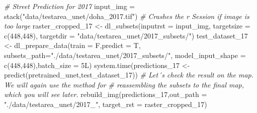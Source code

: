 \documentclass[
]{article}
\newenvironment{Shaded}{\begin{snugshade}}{\end{snugshade}}
\newcommand{\AttributeTok}[1]{\textcolor[rgb]{0.77,0.63,0.00}{#1}}
\newcommand{\CommentTok}[1]{\textcolor[rgb]{0.56,0.35,0.01}{\textit{#1}}}
\newcommand{\DecValTok}[1]{\textcolor[rgb]{0.00,0.00,0.81}{#1}}
\newcommand{\FunctionTok}[1]{\textcolor[rgb]{0.00,0.00,0.00}{#1}}
\newcommand{\NormalTok}[1]{#1}
\newcommand{\OtherTok}[1]{\textcolor[rgb]{0.56,0.35,0.01}{#1}}
\newcommand{\StringTok}[1]{\textcolor[rgb]{0.31,0.60,0.02}{#1}}
\begin{document}
\begin{Shaded}
\begin{Highlighting}[]
\CommentTok{\# Street Prediction for 2017}
\NormalTok{input\_img }\OtherTok{=} \FunctionTok{stack}\NormalTok{(}\StringTok{"data/testarea\_unet/doha\_2017.tif"}\NormalTok{)}
\CommentTok{\# Crashes the r Session if image is too large}
\NormalTok{raster\_cropped\_17 }\OtherTok{\textless{}{-}} \FunctionTok{dl\_subsets}\NormalTok{(}\AttributeTok{inputrst =}\NormalTok{ input\_img, }\AttributeTok{targetsize =} \FunctionTok{c}\NormalTok{(}\DecValTok{448}\NormalTok{,}\DecValTok{448}\NormalTok{), }
                                \AttributeTok{targetdir =} \StringTok{"data/testarea\_unet/2017\_subsets/"}\NormalTok{)}
\NormalTok{test\_dataset\_17 }\OtherTok{\textless{}{-}} \FunctionTok{dl\_prepare\_data}\NormalTok{(}\AttributeTok{train =}\NormalTok{ F,}\AttributeTok{predict =}\NormalTok{ T,}
                                   \AttributeTok{subsets\_path=}\StringTok{"./data/testarea\_unet/2017\_subsets/"}\NormalTok{,}
                                   \AttributeTok{model\_input\_shape =} \FunctionTok{c}\NormalTok{(}\DecValTok{448}\NormalTok{,}\DecValTok{448}\NormalTok{),}\AttributeTok{batch\_size =}\NormalTok{ 5L)}
\FunctionTok{system.time}\NormalTok{(predictions\_17 }\OtherTok{\textless{}{-}} \FunctionTok{predict}\NormalTok{(pretrained\_unet,test\_dataset\_17))}
\CommentTok{\# Let´s check the result on the map. We will again use the method for }
\CommentTok{\# reassembling the subsets to the final map, which you will see later.}
\FunctionTok{rebuild\_img}\NormalTok{(predictions\_17,}\AttributeTok{out\_path =} \StringTok{"./data/testarea\_unet/2017\_"}\NormalTok{,}
            \AttributeTok{target\_rst =}\NormalTok{ raster\_cropped\_17)}
\end{Highlighting}
\end{Shaded}
\end{document}
